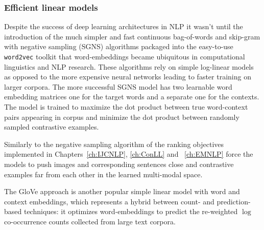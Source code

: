 



\subsubsection{Efficient linear models}
\label{sec:w2v}
Despite the success of deep learning architectures in NLP it wasn't until the introduction
of the much simpler and fast continuous bag-of-words
and skip-gram with negative sampling (SGNS) algorithms \cite{mikolov2013efficient}
packaged into the easy-to-use \texttt{word2vec}
toolkit that
word-embeddings became ubiquitous in computational linguistics and NLP research.
These algorithms rely on simple log-linear models as opposed to the more expensive
neural networks leading to faster training on larger corpora. The more successful SGNS
model has two learnable word embedding matrices one for the target words
and a separate one for the contexts.
The model is trained to maximize the dot product
between true word-context pairs appearing in corpus and minimize the
dot product between randomly sampled contrastive examples. 


Similarly to the negative sampling algorithm of  \cite{mikolov2013efficient} the ranking objectives
implemented in Chapters~\ref{ch:IJCNLP}, \ref{ch:ConLL} and ~\ref{ch:EMNLP}
force the models to push images and corresponding sentences close and contrastive examples
far from each other in the learned multi-modal space.

The GloVe approach \citep{pennington2014glove} is another popular simple linear model
with word  and context embeddings, which
represents a hybrid between count- and prediction-based techniques:
it optimizes word-embeddings to predict the re-weighted
$\log$ co-occurrence counts collected from large text corpora.

